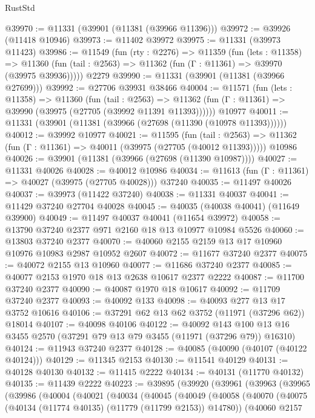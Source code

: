 \begin{lexlean}{RustStd}
\begin{coremodule}
@39970 := @11331 (@39901 (@11381 (@39966 @11396)))
@39972 := @39926 (@11418 @10946)
@39973 := @11402 @39972
@39975 := @11331 (@39973 @11423)
@39986 := @11549
    (fun (rty : @2276) =>
    @11359
      (fun (lets : @11358) =>
      @11360 (fun (tail : @2563) => @11362 (fun (Γ : @11361) => @39970 (@39975 @39936)))))
    @2279
@39990 := @11331 (@39901 (@11381 (@39966 @27699)))
@39992 := @27706 @39931 @38466
@40004 := @11571
    (fun (lets : @11358) =>
    @11360
      (fun (tail : @2563) =>
      @11362 (fun (Γ : @11361) => @39990 (@39975 (@27705 (@39992 @11391 @11393))))))
    @10977
@40011 := @11331 (@39901 (@11381 (@39966 (@27698 (@11390 (@10978 @11393))))))
@40012 := @39992 @10977
@40021 := @11595
    (fun (tail : @2563) => @11362 (fun (Γ : @11361) => @40011 (@39975 (@27705 (@40012 @11393)))))
    @10986
@40026 := @39901 (@11381 (@39966 (@27698 (@11390 @10987))))
@40027 := @11331 @40026
@40028 := @40012 @10986
@40034 := @11613 (fun (Γ : @11361) => @40027 (@39975 (@27705 @40028))) @37240
@40035 := @11497 @40026
@40037 := @39973 (@11422 @37240)
@40038 := @11331 @40037
@40041 := @11429 @37240 @27704 @40028
@40045 := @40035 (@40038 @40041) (@11649 @39900)
@40049 := @11497 @40037 @40041 (@11654 @39972)
@40058 := @13790 @37240 @2377 @971 @2160 @18 @13 @10977 @10984 @5526
@40060 := @13803 @37240 @2377
@40070 := @40060 @2155 @2159 @13 @17 @10960 @10976 @10983 @2987 @10952 @2607
@40072 := @11677 @37240 @2377
@40075 := @40072 @2155 @13 @10960
@40077 := @11686 @37240 @2377
@40085 := @40077 @2153 @1970 @18 @13 @2638 @10617 @2377 @2222
@40087 := @11700 @37240 @2377
@40090 := @40087 @1970 @18 @10617
@40092 := @11709 @37240 @2377
@40093 := @40092 @133
@40098 := @40093 @277 @13 @17 @3752 @10616
@40106 := @37291 @62 @13 @62 @3752 (@11971 (@37296 @62)) @18014
@40107 := @40098 @40106
@40122 := @40092
    @143
    @100
    @13
    @16
    @3455
    @2570
    (@37291 @79 @13 @79 @3455 (@11971 (@37296 @79)) @16310)
@40124 := @11943 @37240 @2377
@40128 := @40085 (@40090 (@40107 (@40122 @40124)))
@40129 := @11345 @2153
@40130 := @11541 @40129
@40131 := @40128 @40130
@40132 := @11415 @2222
@40134 := @40131 (@11770 @40132)
@40135 := @11439 @2222
@40223 := @39895
    (@39920
      (@39961
        (@39963
          (@39965
            (@39986
              (@40004
                (@40021
                  (@40034
                    (@40045
                      (@40049
                        (@40058
                          (@40070
                            (@40075 (@40134 (@11774 @40135) (@11779 (@11799 @2153)) @14780))
                            (@40060
                              @2157

\end{coremodule}
\end{lexlean}
